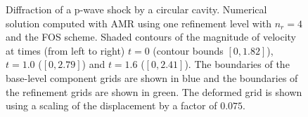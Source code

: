 {
\newcommand{\figWidtha}{5.5cm}
\newcommand{\trimfiga}[2]{\trimPlotb{#1}{#2}{.1}{.2}{.075}{.15}}
\begin{figure}[hbt]
\begin{center}
\end{center}
\caption{Diffraction of a p-wave shock by a circular cavity.  Numerical solution computed with AMR using one refinement level with $n_r=4$ and
the FOS scheme.  Shaded contours of the magnitude of velocity at times (from left to right)
$t=0$ (contour bounds $[0,1.82]$), $t=1.0$ ($[0,2.79]$) and $t=1.6$ ($[0,2.41]$).
The boundaries of the base-level component grids are shown in blue and the boundaries of the refinement grids are shown in green.  The deformed grid is shown using a scaling of the displacement by a factor of $0.075$. }
\label{fig:cylDiffractEvolution}
\end{figure}
}
